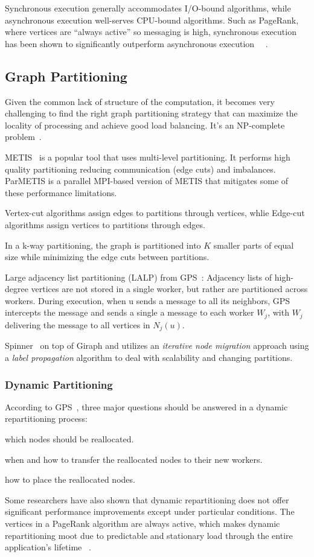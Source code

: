 \documentclass[UTF8,12pt,a4paper]{article}
\begin{document}
Synchronous execution generally accommodates I/O-bound algorithms,
while asynchronous execution well-serves CPU-bound algorithms.
Such as PageRank, where vertices are ``always active'' so messaging is high,
synchronous execution has been shown to significantly outperform asynchronous execution
~\cite{DBLP:journals/csur/McCuneWM15}~\cite{DBLP:journals/csur/HeidariSCB18}.

\subsection{Graph Partitioning}
Given the common lack of structure of the computation,
it becomes very challenging to find the right graph partitioning strategy
that can maximize the locality of processing and achieve good load balancing.
It's an NP-complete problem~\cite{DBLP:conf/spaa/AndreevR04}.

METIS~\cite{DBLP:conf/icpp/KarypisK95} is a popular tool that uses multi-level partitioning.
It performs high quality partitioning reducing communication (edge cuts) and imbalances.
ParMETIS is a parallel MPI-based version of METIS
that mitigates some of these performance limitations.

Vertex-cut algorithms assign edges to partitions through vertices,
whlie Edge-cut algorithms assign vertices to partitions through edges.

In a k-way partitioning, the graph is partitioned into $K$ smaller parts of equal size
while minimizing the edge cuts between partitions.

Large adjacency list partitioning (LALP) from GPS~\cite{DBLP:conf/ssdbm/SalihogluW13}:
Adjacency lists of high-degree vertices are not stored in a single worker,
but rather are partitioned across workers.
During execution, when u sends a message to all its neighbors,
GPS intercepts the message and sends a single a message to each worker $W_j$,
with $W_j$ delivering the message to all vertices in $N_j(u)$.

Spinner~\cite{DBLP:conf/icde/MartellaLLS17} on top of Giraph
and utilizes an \textit{iterative node migration} approach
using a \textit{label propagation} algorithm to
deal with scalability and changing partitions.
\subsubsection{Dynamic Partitioning}
According to GPS~\cite{DBLP:conf/ssdbm/SalihogluW13},
three major questions should be answered in a dynamic repartitioning process:
\begin{compactitem}
  \item which nodes should be reallocated.
  \item when and how to transfer the reallocated nodes to their new workers.
  \item how to place the reallocated nodes.
\end{compactitem}
Some researchers have also shown that
dynamic repartitioning does not offer significant performance improvements
except under particular conditions.
The vertices in a PageRank algorithm are always active,
which makes dynamic repartitioning moot
due to predictable and stationary load through the entire application’s lifetime
~\cite{DBLP:journals/csur/HeidariSCB18}.
\end{document}
